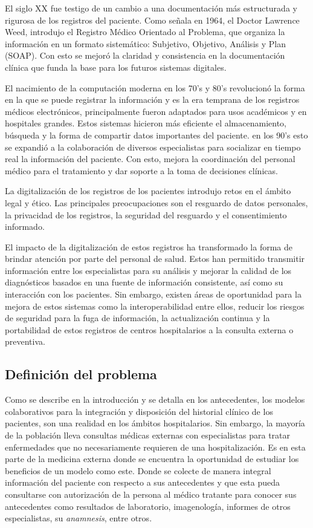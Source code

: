     El siglo XX fue testigo de un cambio a una documentación más estructurada y rigurosa de los registros del paciente. Como señala \cite{jaroudi_remembering_2019} en 1964, el Doctor Lawrence Weed, introdujo el Registro Médico Orientado al Problema, que organiza la información en un formato sistemático: Subjetivo, Objetivo, Análisis y Plan (SOAP). Con esto se mejoró la claridad y consistencia en la documentación clínica que funda la base para los futuros sistemas digitales.

    El nacimiento de la computación moderna en los 70's y 80's revolucionó la forma en la que se puede registrar la información y es la era temprana de los registros médicos electrónicos, principalmente fueron adaptados para usos académicos y en hospitales grandes. Estos sistemas hicieron más eficiente el almacenamiento, búsqueda y la forma de compartir datos importantes del paciente. en los 90's esto se expandió a la colaboración de diversos especialistas para socializar en tiempo real la información del paciente. Con esto, mejora la coordinación del personal médico para el tratamiento y dar soporte a la toma de decisiones clínicas.

    La digitalización de los registros de los pacientes introdujo retos en el ámbito legal y ético. Las principales preocupaciones son el resguardo de datos personales, la privacidad de los registros, la seguridad del resguardo y el consentimiento informado.

    El impacto de la digitalización de estos registros ha transformado la forma de brindar atención por parte del personal de salud. Estos han permitido transmitir información entre los especialistas para su análisis y mejorar la calidad de los diagnósticos basados en una fuente de información consistente, así como su interacción con los pacientes. Sin embargo, existen áreas de oportunidad para la mejora de estos sistemas como la interoperabilidad entre ellos, reducir los riesgos de seguridad para la fuga de información, la actualización continua y la portabilidad de estos registros de centros hospitalarios a la consulta externa o preventiva.
    \subsection{Definición del problema}
    Como se describe en la introducción y se detalla en los antecedentes, los modelos colaborativos para la integración y disposición del historial clínico de los pacientes, son una realidad en los ámbitos hospitalarios. Sin embargo, la mayoría de la población lleva consultas médicas externas con especialistas para tratar enfermedades que no necesariamente requieren de una hospitalización. Es en esta parte de la medicina externa donde se encuentra la oportunidad de estudiar los beneficios de un modelo como este. Donde se colecte de manera integral información del paciente con respecto a sus antecedentes y que esta pueda consultarse con autorización de la persona al médico tratante para conocer sus antecedentes como resultados de laboratorio, imagenología, informes de otros especialistas, su \emph{anamnesis}, entre otros.

